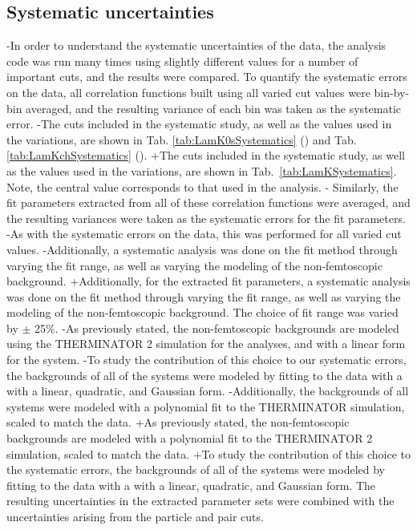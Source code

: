 \begin{table}[htbp]
\begin{table}[htbp]
 \subsection{Systematic uncertainties}
 \label{SysErrs}
 
-In order to understand the systematic uncertainties of the data, the analysis code was run many times using slightly different values for a number of important cuts, and the results were compared.  
 To quantify the systematic errors on the data, all correlation functions built using all varied cut values were bin-by-bin averaged, and the resulting variance of each bin was taken as the systematic error.  
-The cuts included in the systematic study, as well as the values used in the variations, are shown in Tab. \ref{tab:LamK0sSystematics} (\LamKs) and Tab. \ref{tab:LamKchSystematics} (\LamKpm).  
+The cuts included in the systematic study, as well as the values used in the variations, are shown in Tab.\ \ref{tab:LamKSystematics}.  
 Note, the central value corresponds to that used in the analysis.
-
 Similarly, the fit parameters extracted from all of these correlation functions were averaged, and the resulting variances were taken as the systematic errors for the fit parameters.
-As with the systematic errors on the data, this was performed for all varied cut values.
-Additionally, a systematic analysis was done on the fit method through varying the \kstar fit range, as well as varying the modeling of the non-femtoscopic background.
+Additionally, for the extracted fit parameters, a systematic analysis was done on the fit method through varying the \kstar fit range, as well as varying the modeling of the non-femtoscopic background.
 The choice of \kstar fit range was varied by $\pm$ 25\%. 
-As previously stated, the non-femtoscopic backgrounds are modeled using the THERMINATOR 2 simulation for the \LamKpm analyses, and with a linear form for the \LamKs system.
-To study the contribution of this choice to our systematic errors, the backgrounds of all of the systems were modeled by fitting to the data with a with a linear, quadratic, and Gaussian form.
-Additionally, the backgrounds of all systems were modeled with a polynomial fit to the THERMINATOR simulation, scaled to match the data. 
+As previously stated, the non-femtoscopic backgrounds are modeled with a polynomial fit to the THERMINATOR 2 simulation, scaled to match the data.
+To study the contribution of this choice to the systematic errors, the backgrounds of all of the systems were modeled by fitting to the data with a with a linear, quadratic, and Gaussian form.
 The resulting uncertainties in the extracted parameter sets were combined with the uncertainties arising from the particle and pair cuts.
 

\end{table}
\end{table}
